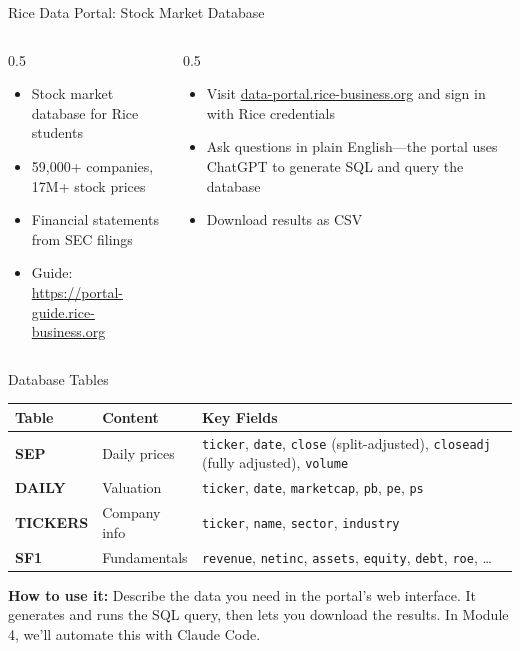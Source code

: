 \documentclass[aspectratio=169]{beamer}
\begin{document}
\begin{frame}{Rice Data Portal: Stock Market Database}
\begin{columns}[T]
\begin{column}{0.5\textwidth}
\begin{shadedbox}[title=\textbf{What It Is}]
\begin{itemize}\small
  \item Stock market database for Rice students
  \item 59{,}000+ companies, 17M+ stock prices
  \item Financial statements from SEC filings
  \item Guide: \url{https://portal-guide.rice-business.org}
\end{itemize}
\end{shadedbox}
\end{column}
\begin{column}{0.5\textwidth}
\begin{shadedbox}[title=\textbf{Using the Web Interface}]
\begin{itemize}\small
  \item Visit \href{https://data-portal.rice-business.org}{data-portal.rice-business.org} and sign in with Rice credentials
  \item Ask questions in plain English---the portal uses ChatGPT to generate SQL and query the database
  \item Download results as CSV
\end{itemize}
\end{shadedbox}
\end{column}
\end{columns}
\end{frame}

\begin{frame}{Database Tables}
\begin{center}\small
\begin{tabular}{@{} l l p{7.5cm} @{}}
\toprule
\textbf{Table} & \textbf{Content} & \textbf{Key Fields} \\
\midrule
\textbf{SEP} & Daily prices & \texttt{ticker}, \texttt{date}, \texttt{close} (split-adjusted), \texttt{closeadj} (fully adjusted), \texttt{volume} \\
\textbf{DAILY} & Valuation & \texttt{ticker}, \texttt{date}, \texttt{marketcap}, \texttt{pb}, \texttt{pe}, \texttt{ps} \\
\textbf{TICKERS} & Company info & \texttt{ticker}, \texttt{name}, \texttt{sector}, \texttt{industry} \\
\textbf{SF1} & Fundamentals & \texttt{revenue}, \texttt{netinc}, \texttt{assets}, \texttt{equity}, \texttt{debt}, \texttt{roe}, \ldots \\
\bottomrule
\end{tabular}
\end{center}
\vfill
\textbf{How to use it:} Describe the data you need in the portal's web interface.  It generates and runs the SQL query, then lets you download the results.  In Module 4, we'll automate this with Claude Code.
\end{frame}
\end{document}
